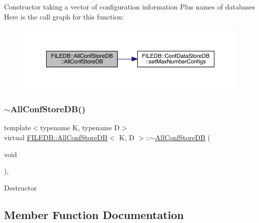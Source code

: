 Constructor taking a vector of configuration information Plus names of databases Here is the call graph for this function\+:
\nopagebreak
\begin{figure}[H]
\begin{center}
\leavevmode
\includegraphics[width=350pt]{df/db6/classFILEDB_1_1AllConfStoreDB_ab8b213578395f0ac7d436a82f4a26fe1_cgraph}
\end{center}
\end{figure}
\mbox{\label{classFILEDB_1_1AllConfStoreDB_ac5fe65eab60f20d7b8124c69c0bd5923}} 
\subsubsection{\texorpdfstring{$\sim$AllConfStoreDB()}{~AllConfStoreDB()}\hspace{0.1cm}{\footnotesize\ttfamily [3/3]}}
{\footnotesize\ttfamily template$<$typename K, typename D$>$ \\
virtual \mbox{\hyperlink{classFILEDB_1_1AllConfStoreDB}{F\+I\+L\+E\+D\+B\+::\+All\+Conf\+Store\+DB}}$<$ K, D $>$\+::$\sim$\mbox{\hyperlink{classFILEDB_1_1AllConfStoreDB}{All\+Conf\+Store\+DB}} (\begin{DoxyParamCaption}\item[{void}]{ }\end{DoxyParamCaption})\hspace{0.3cm}{\ttfamily [inline]}, {\ttfamily [virtual]}}

Destructor 

\subsection{Member Function Documentation}
\mbox{\label{classFILEDB_1_1AllConfStoreDB_a7bb7f812d80471897860af5692eb5bd2}} 
